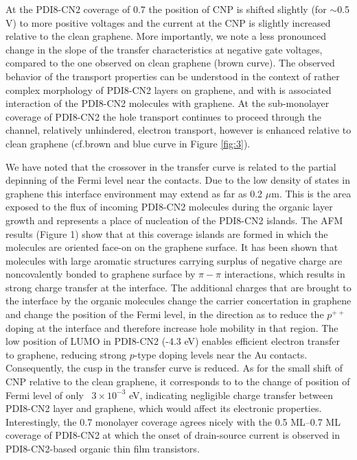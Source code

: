 \documentclass[review]{elsarticle}
\begin{document}
At the PDI8-CN2 coverage of 0.7 the position of CNP is shifted slightly (for $\sim$0.5 V)  to more positive voltages and the current at the CNP is slightly increased relative to the clean graphene.
  More importantly, we note a less pronounced change in the slope of the transfer characteristics at negative gate voltages, compared to the one observed on clean graphene (brown curve).
 The observed behavior of the transport properties can be understood in the context of rather complex morphology of PDI8-CN2 layers on graphene, and with is associated interaction of the PDI8-CN2 molecules with graphene.
 At the sub-monolayer coverage of PDI8-CN2 the hole transport continues to proceed through the channel, relatively unhindered, electron transport, however is enhanced relative to clean graphene (cf.brown and blue curve in Figure \ref{fig:3}).

 We have noted that the crossover in the transfer curve is related to the partial depinning of the Fermi level near the contacts.
 Due to the low density of states in graphene this interface environment may extend as far as 0.2 $\mu$m\cite{mueller-2009}.
 This is the area exposed to the flux of incoming PDI8-CN2 molecules during the organic layer growth and represents a place of nucleation of the PDI8-CN2 islands.
 The AFM results (Figure 1) show that at this coverage islands are formed in which the molecules are oriented face-on on the graphene surface.
 It has been shown\cite{su-2009} that molecules with large aromatic structures carrying surplus of negative charge are noncovalently bonded to graphene surface by $\pi-\pi$ interactions, which results in strong charge transfer at the interface.
 The additional charges that are brought to the interface by the organic molecules change the carrier concertation in graphene and change the position of the Fermi level, in the direction as to reduce the $p^{++}$ doping at the interface and therefore increase hole mobility in that region.
 The low position of LUMO in PDI8-CN2 (-4.3 eV)\cite{jones-2007} enables efficient electron transfer to graphene, reducing strong $p$-type doping levels near the Au contacts.
 Consequently, the cusp in the transfer curve is reduced.
   As for the small shift of CNP relative to the clean graphene, it corresponds to to the change of position of Fermi level of only ~$3\times10^{-3}$ eV, indicating negligible charge transfer between PDI8-CN2 layer and graphene, which would affect its electronic properties.
 Interestingly, the 0.7 monolayer coverage agrees nicely with the 0.5 ML--0.7 ML coverage of PDI8-CN2 at which the onset of  drain-source current is observed in PDI8-CN2-based organic thin film transistors\cite{liscio-2013}.
 
\end{document}

